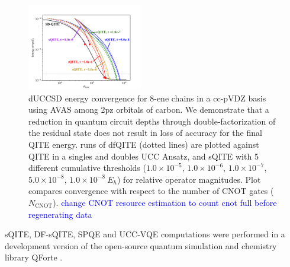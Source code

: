 \documentclass[aip,jcp,amsmath,amssymb, reprint]{revtex4-1}
\begin{document}
\begin{figure}[h!]
\centering
\includegraphics[width=0.45\textwidth]{sqite_paper/paper_df_ham_plot.png}
\caption{dUCCSD energy convergence for 8-ene chains in a cc-pVDZ basis using AVAS among 2pz orbitals of carbon. We demonstrate that a reduction in quantum circuit depths through double-factorization of the residual state does not result in loss of accuracy for the final QITE energy. runs of dfQITE (dotted lines) are plotted against QITE in a singles and doubles UCC Ansatz, and sQITE with 5 different cumulative thresholds ($1.0 \times 10^{-5}$, $1.0 \times 10^{-6}$, $1.0 \times 10^{-7}$, $5.0 \times 10^{-8}$, $1.0 \times 10^{-8}\ E_h$) for relative operator magnitudes. Plot compares convergence with respect to the number of CNOT gates ($N_\mathrm{CNOT}$). \textcolor{blue}{change CNOT resource estimation to count cnot full before regenerating data}}
\label{fig:db_plot_1.0A}
\end{figure}



sQITE, DF-sQITE, SPQE and UCC-VQE computations were performed in a development version of the open-source quantum simulation and chemistry library QForte \cite{stair2021qforte}. 
\end{document}
